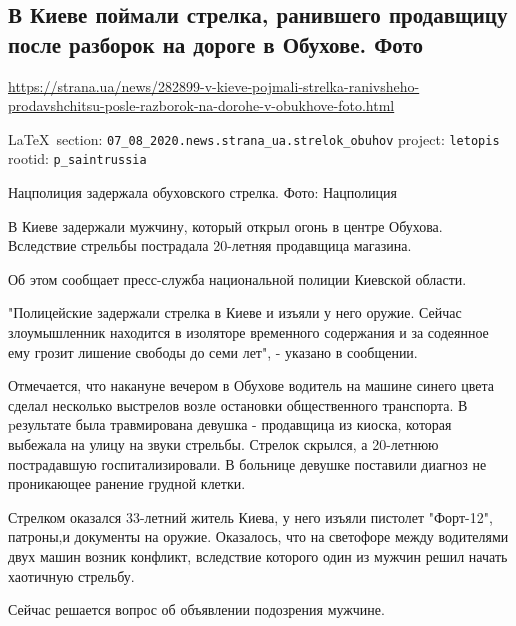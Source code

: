  
 
\subsection{В Киеве поймали стрелка, ранившего продавщицу после разборок на дороге в Обухове. Фото}
\url{https://strana.ua/news/282899-v-kieve-pojmali-strelka-ranivsheho-prodavshchitsu-posle-razborok-na-dorohe-v-obukhove-foto.html}
  
\vspace{0.5cm}
 {\ifDEBUG\small\LaTeX~section: \verb|07_08_2020.news.strana_ua.strelok_obuhov| project: \verb|letopis| rootid: \verb|p_saintrussia| \fi}
\vspace{0.5cm}

Нацполиция задержала обуховского стрелка. Фото: Нацполиция

В Киеве задержали мужчину, который открыл огонь в центре Обухова. Вследствие
стрельбы пострадала 20-летняя продавщица магазина. 

Об этом сообщает пресс-служба национальной полиции Киевской области.

"Полицейские задержали стрелка в Киеве и изъяли у него оружие. Сейчас
злоумышленник находится в изоляторе временного содержания и за содеянное ему
грозит лишение свободы до семи лет", - указано в сообщении. 

Отмечается, что накануне вечером в Обухове водитель на машине синего цвета
сделал несколько выстрелов возле остановки общественного транспорта. В
pезультате была травмирована девушка - продавщица из киоска, которая выбежала
на улицу на звуки стрельбы. Стрелок скрылся, а 20-летнюю пострадавшую
госпитализировали. В больнице девушке поставили диагноз не проникающее ранение
грудной клетки.

Стрелком оказался 33-летний житель Киева, у него изъяли пистолет "Форт-12",
патроны,и документы на оружие. Оказалось, что на светофоре между водителями
двух машин возник конфликт, вследствие которого один из мужчин решил начать
хаотичную стрельбу. 

Сейчас решается вопрос об объявлении подозрения мужчине. 
